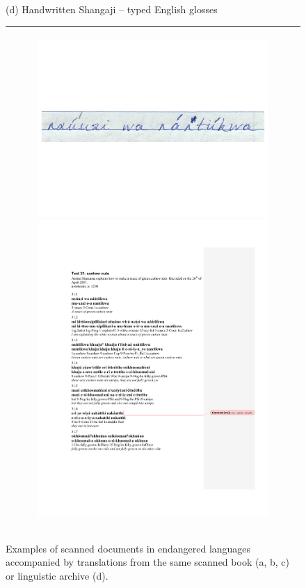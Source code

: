 \begin{figure}[t]
\begin{subfigure}[t]{\columnwidth}
      \vspace{0.6em}
    \end{subfigure}
    \footnotesize{(d) Handwritten Shangaji -- typed English glosses}
    \begin{tabular}{|@{\ \ }c@{\ \ }|}
    \hline
     \begin{subfigure}[t]{0.9\columnwidth}
      \centering
      \includegraphics[width=0.9\columnwidth]{images/sha_img.pdf}
      \includegraphics[width=0.5\columnwidth]{images/sha_text.pdf}
    \end{subfigure}\\
    \hline
    \end{tabular}
    \caption{Examples of scanned documents in endangered languages accompanied by translations from the same scanned book (a, b, c) or linguistic archive (d).}
    \label{fig:dataset_example}
    \vspace{-1.2em}
\end{figure}
